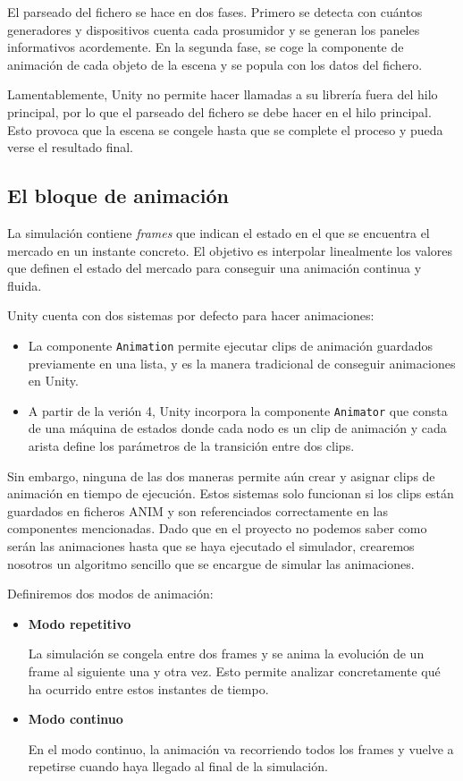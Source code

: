 \documentclass[12pt,a4paper,openright,oneside]{article}
\numberwithin{equation}{section}
\theoremstyle{definition}
\begin{document}
\begin{itemize}
El parseado del fichero se hace en dos fases. Primero se detecta con cuántos generadores y dispositivos cuenta cada prosumidor y se generan los paneles informativos acordemente.
En la segunda fase, se coge la componente de animación de cada objeto de la escena y se popula con los datos del fichero.

Lamentablemente, Unity no permite hacer llamadas a su librería fuera del hilo principal, por lo que el parseado del fichero se debe hacer en el hilo principal. Esto provoca que la escena se congele hasta que se complete el proceso y pueda verse el resultado final.
\end{itemize} 



\subsection{El bloque de animación}

La simulación contiene \textit{frames} que indican el estado en el que se encuentra el mercado en un instante concreto. El objetivo es interpolar linealmente los valores que definen el estado del mercado para conseguir una animación continua y fluida. 

Unity cuenta con dos sistemas por defecto para hacer animaciones:
\begin{itemize}
\item La componente \texttt{Animation} permite ejecutar clips de animación guardados previamente en una lista, y es la manera tradicional de conseguir animaciones en Unity.
\item A partir de la verión 4, Unity incorpora la componente \texttt{Animator} que consta de una máquina de estados donde cada nodo es un clip de animación y cada arista define los parámetros de la transición entre dos clips.
\end{itemize}

Sin embargo, ninguna de las dos maneras permite aún crear y asignar clips de animación en tiempo de ejecución. Estos sistemas solo funcionan si los clips están guardados en ficheros ANIM y son referenciados correctamente en las componentes mencionadas.
Dado que en el proyecto no podemos saber como serán las animaciones hasta que se haya ejecutado el simulador, crearemos nosotros un algoritmo sencillo que se encargue de simular las animaciones.

Definiremos dos modos de animación: 

\begin{itemize}
\item \textbf{Modo repetitivo}

La simulación se congela entre dos frames y se anima la evolución de un frame al siguiente una y otra vez. Esto permite analizar concretamente qué ha ocurrido entre estos instantes de tiempo. 

\item \textbf{Modo continuo}

En el modo continuo, la animación va recorriendo todos los frames y vuelve a repetirse cuando haya llegado al final de la simulación.

\end{itemize}
\end{document}
